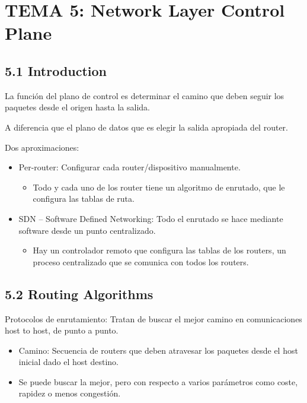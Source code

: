\documentclass[12pt, twoside, openright]{report} %
\begin{document}
\chapter{TEMA 5: Network Layer Control Plane}

\section{5.1 Introduction}



La función del plano de control es determinar el camino que deben
seguir los paquetes desde el origen hasta la salida.

A diferencia que el plano de datos que es elegir la salida apropiada
del router.

Dos aproximaciones:

\begin{itemize}
	\item Per-router: Configurar cada router/dispositivo manualmente.
	      \begin{itemize}
		      \item Todo y cada uno de los router tiene un algoritmo de enrutado,
		            que le configura las tablas de ruta.
	      \end{itemize}
	\item SDN -- Software Defined Networking: Todo el enrutado se hace
	      mediante software desde un punto centralizado.
	      \begin{itemize}
		      \item Hay un controlador remoto que configura las tablas de los
		            routers, un proceso centralizado que se comunica con todos los
		            routers.
	      \end{itemize}
\end{itemize}


\section{5.2 Routing Algorithms}

Protocolos de enrutamiento: Tratan de buscar el mejor camino en
comunicaciones host to host, de punto a punto.

\begin{itemize}
	\item Camino: Secuencia de routers que deben atravesar los paquetes
	      desde el host inicial dado el host destino.
	\item Se puede buscar la mejor, pero con respecto a varios parámetros
	      como coste, rapidez o menos congestión.
\end{itemize}
\end{document}
